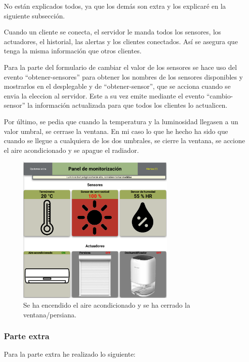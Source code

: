\documentclass{article}
\begin{document}
No están explicados todos, ya que los demás son extra y los explicaré en la siguiente subsección.

Cuando un cliente se conecta, el servidor le manda todos los sensores, los actuadores, el historial, las alertas y los clientes conectados. Así se asegura que tenga la misma información que otros clientes.



Para la parte del formulario de cambiar el valor de los sensores se hace uso del evento ``obtener-sensores'' para obtener los nombres de los sensores disponibles y mostrarlos en el desplegable y de ``obtener-sensor'', que se acciona cuando se envia la eleccion al servidor. Este a su vez emite mediante el evento ``cambio-sensor'' la información actualizada para que todos los clientes lo actualicen.

Por último, se pedia que cuando la temperatura y la luminosidad llegasen a un valor umbral, se cerrase la ventana. En mi caso lo que he hecho ha sido que cuando se llegue a cualquiera de los dos umbrales, se cierre la ventana, se accione el aire acondicionado y se apague el radiador.

\begin{figure}[H]
    \centering
    \includegraphics[width=0.7\textwidth]{images/muchaluz.png}
    \caption{Se ha encendido el aire acondicionado y se ha cerrado la ventana/persiana.}
\end{figure}

\subsubsection{Parte extra}
Para la parte extra he realizado lo siguiente:
\end{document}
